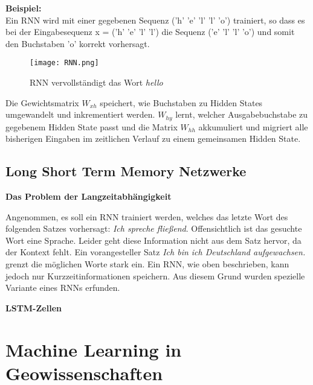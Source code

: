 \documentclass[11pt,fleqn]{book}
\begin{document}
\textbf{Beispiel:}\\
Ein RNN wird mit einer gegebenen Sequenz ('h' 'e' 'l' 'l' 'o') 
trainiert, so dass es bei der Eingabesequenz x = ('h' 'e' 'l' 'l') die Sequenz ('e' 'l' 'l' 'o') und somit den Buchstaben 'o' korrekt vorhersagt. 
\begin{figure}[h]
\centering
\texttt{[image: RNN.png]}
\caption{RNN vervollständigt das Wort \textit{hello}}
\end{figure}

Die Gewichtsmatrix $W_{xh}$ speichert, wie Buchstaben zu Hidden States umgewandelt und inkrementiert werden. $W_{hy}$ lernt, welcher Ausgabebuchstabe zu gegebenem Hidden State passt und die Matrix $W_{hh}$ akkumuliert und migriert alle bisherigen Eingaben im zeitlichen Verlauf zu einem gemeinsamen Hidden State.

\subsection{Long Short Term Memory Netzwerke}

\textbf{Das Problem der Langzeitabhängigkeit}

Angenommen, es soll ein RNN trainiert werden, welches das letzte Wort des folgenden Satzes vorhersagt: \textit{Ich spreche fließend}. Offensichtlich ist das gesuchte Wort eine Sprache. Leider geht diese Information nicht aus dem Satz hervor, da der Kontext fehlt. Ein vorangesteller Satz \textit{Ich bin ich Deutschland aufgewachsen.} grenzt die möglichen Worte stark ein. Ein RNN, wie oben beschrieben, kann jedoch nur Kurzzeitinformationen speichern. \cite{dynrnn}  Aus diesem Grund wurden spezielle Variante eines RNNs erfunden.

\textbf{LSTM-Zellen}























\cite{lstm}

\newpage
\section{Machine Learning in Geowissenschaften}
\end{document}
